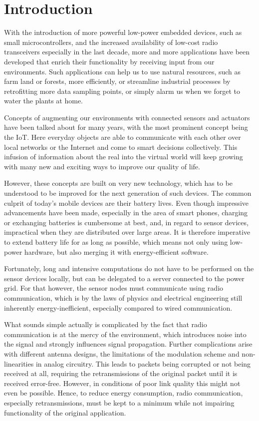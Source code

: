 \chapter{Introduction}

With the introduction of more powerful low-power embedded devices, such as small microcontrollers, and the increased availability of low-cost radio transceivers especially in the last decade, more and more applications have been developed that enrich their functionality by receiving input from our environments.
Such applications can help us to use natural resources, such as farm land or forests, more efficiently, or streamline industrial processes by retrofitting more data sampling points, or simply alarm us when we forget to water the plants at home.

Concepts of augmenting our environments with connected sensors and actuators have been talked about for many years, with the most prominent concept being the \ac{IoT}.
Here everyday objects are able to communicate with each other over local networks or the Internet and come to smart decisions collectively.
This infusion of information about the real into the virtual world will keep growing with many new and exciting ways to improve our quality of life.

However, these concepts are built on very new technology, which has to be understood to be improved for the next generation of such devices.
The common culprit of today's mobile devices are their battery lives.
Even though impressive advancements have been made, especially in the area of smart phones, charging or exchanging batteries is cumbersome at best, and, in regard to sensor devices, impractical when they are distributed over large areas.
It is therefore imperative to extend battery life for as long as possible, which means not only using low-power hardware, but also merging it with energy-efficient software.

Fortunately, long and intensive computations do not have to be performed on the sensor devices locally, but can be delegated to a server connected to the power grid.
For that however, the sensor nodes must communicate using radio communication, which is by the laws of physics and electrical engineering still inherently energy-inefficient, especially compared to wired communication.

What sounds simple actually is complicated by the fact that radio communication is at the mercy of the environment, which introduces noise into the signal and strongly influences signal propagation.
Further complications arise with different antenna designs, the limitations of the modulation scheme and non-linearities in analog circuitry.
This leads to packets being corrupted or not being received at all, requiring the retransmissions of the original packet until it is received error-free.
However, in conditions of poor link quality this might not even be possible.
Hence, to reduce energy consumption, radio communication, especially retransmissions, must be kept to a minimum while not impairing functionality of the original application.

